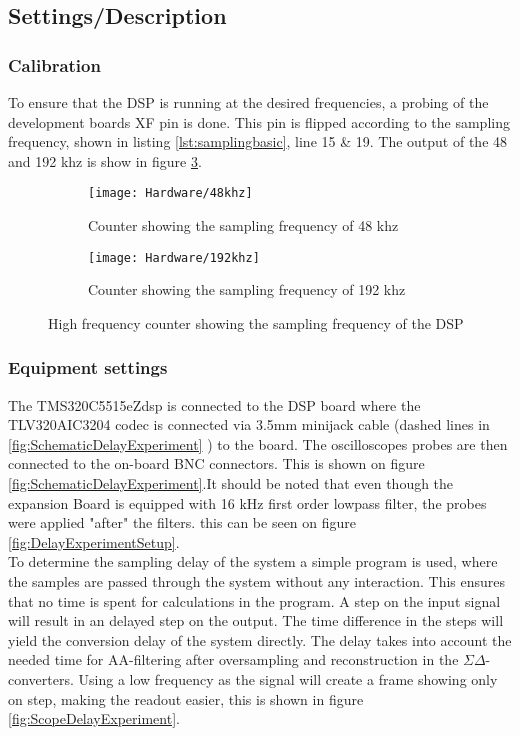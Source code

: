 \subsection{Settings/Description}


\subsubsection{Calibration}
To ensure that the DSP is running at the desired frequencies, a probing of the development boards XF pin is done. This pin is flipped according to the sampling frequency, shown in listing \ref{lst:samplingbasic}, line 15 \& 19. The output of the 48 and 192 khz is show in figure \ref{fig:countingthefs}. 
\begin{figure}[H]
	\centering
	\begin{subfigure}[b]{.45\textwidth}
		\centering
		\texttt{[image: Hardware/48khz]}
		\caption{Counter showing the sampling frequency of 48 khz}
		\label{fig:48khzcounter}
	\end{subfigure}
	\hfill
	\begin{subfigure}[b]{.45\textwidth}
		\centering
		\texttt{[image: Hardware/192khz]}
		\caption{Counter showing the sampling frequency of 192 khz}
		\label{fig:192khzcounter}
	\end{subfigure}	
	\caption{High frequency counter showing the sampling frequency of the DSP}
	\label{fig:countingthefs}
\end{figure}


\subsubsection{Equipment settings}
The TMS320C5515eZdsp is connected to the DSP board where the TLV320AIC3204 codec is connected via 3.5mm minijack cable (dashed lines in \autoref{fig:SchematicDelayExperiment} ) to the board. The oscilloscopes probes are then connected to the on-board BNC connectors. This is shown on figure \ref{fig:SchematicDelayExperiment}.It should be noted that even though the expansion Board is equipped with 16 kHz first order lowpass filter, the probes were applied "after" the filters. this can be seen on figure \ref{fig:DelayExperimentSetup}.
\\
To determine the sampling delay of the system a simple program is used, where the samples are passed through the system without any interaction. This ensures that no time is spent for calculations in the program. A step on the input signal will result in an delayed step on the output. The time difference in the steps will yield the conversion delay of the system directly. The delay takes into account the needed time for AA-filtering after oversampling and reconstruction in the $\Sigma\Delta$-converters. Using a low frequency as the signal will create a frame showing only on step, making the readout easier, this is shown in figure \ref{fig:ScopeDelayExperiment}.

